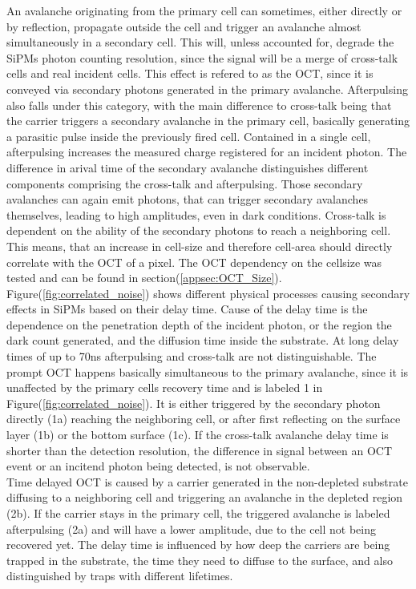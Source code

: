 \documentclass[12pt,article,type=msc,colorback,accentcolor=tud9c]{tudthesis}
\begin{document}
An avalanche originating from the primary cell can sometimes, either directly or by reflection, propagate outside the cell and trigger an avalanche almost simultaneously in a secondary cell. This will, unless accounted for, degrade the SiPMs photon counting resolution, since the signal will be a merge of cross-talk cells and real incident cells. This effect is refered to as the OCT, since it is conveyed via secondary photons generated in the primary avalanche. Afterpulsing also falls under this category, with the main difference to cross-talk being that the carrier triggers a secondary avalanche in the primary cell, basically generating a parasitic pulse inside the previously fired cell. Contained in a single cell, afterpulsing increases the measured charge registered for an incident photon. The difference in arival time of the secondary avalanche distinguishes different components comprising the cross-talk and afterpulsing. Those secondary avalanches can again emit photons, that can trigger secondary avalanches themselves, leading to high amplitudes, even in dark conditions. Cross-talk is dependent on the ability of the secondary photons to reach a neighboring cell. This means, that an increase in cell-size and therefore cell-area should directly correlate with the OCT of a pixel. The OCT dependency on the cellsize was tested and can be found in section(\ref{appsec:OCT_Size}).\\
Figure(\ref{fig:correlated_noise}) shows different physical processes causing secondary effects in SiPMs based on their delay time. Cause of the delay time is the dependence on the penetration depth of the incident photon, or the region the dark count generated, and the diffusion time inside the substrate. At long delay times of up to 70ns afterpulsing and cross-talk are not distinguishable.\cite{ModelCTAP} The prompt OCT happens basically simultaneous to the primary avalanche, since it is unaffected by the primary cells recovery time and is labeled 1 in Figure(\ref{fig:correlated_noise}). It is either triggered by the secondary photon directly (1a) reaching the neighboring cell, or after first reflecting on the surface layer (1b) or the bottom surface (1c). If the cross-talk avalanche delay time is shorter than the detection resolution, the difference in signal between an OCT event or an incitend photon being detected, is not observable.\\
Time delayed OCT is caused by a carrier generated in the non-depleted substrate diffusing to a neighboring cell and triggering an avalanche in the depleted region (2b). If the carrier stays in the primary cell, the triggered avalanche is labeled afterpulsing (2a) and will have a lower amplitude, due to the cell not being recovered yet. The delay time is influenced by how deep the carriers are being trapped in the substrate, the time they need to diffuse to the surface, and also distinguished by traps with different lifetimes.\\
\end{document}
